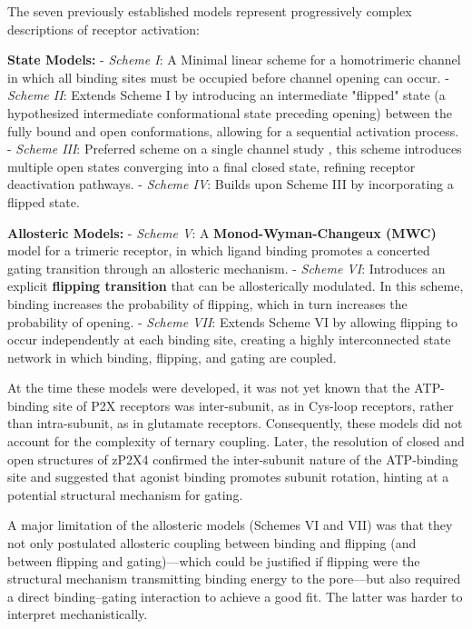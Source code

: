 \documentclass[9pt]{elife}
\begin{document}
	The seven previously established models represent progressively complex descriptions of receptor activation:
	
	\textbf{State Models:}  
	- \textit{Scheme I}: A Minimal linear scheme for a homotrimeric channel in which all binding sites must be occupied before channel opening can occur.  
	- \textit{Scheme II}: Extends Scheme I by introducing an intermediate "flipped" state (a hypothesized intermediate conformational state preceding opening) between the fully bound and open conformations, allowing for a sequential activation process.  
	- \textit{Scheme III}: Preferred scheme on a single channel study \cite{properties_single_channe}, this scheme introduces multiple open states converging into a final closed state, refining receptor deactivation pathways.  
	- \textit{Scheme IV}: Builds upon Scheme III by incorporating a flipped state.  
	
	\textbf{Allosteric Models:}  
	- \textit{Scheme V}: A \textbf{Monod-Wyman-Changeux (MWC)} model for a trimeric receptor, in which ligand binding promotes a concerted gating transition through an allosteric mechanism.  
	- \textit{Scheme VI}: Introduces an explicit \textbf{flipping transition} that can be allosterically modulated. In this scheme, binding increases the probability of flipping, which in turn increases the probability of opening.  
	- \textit{Scheme VII}: Extends Scheme VI by allowing flipping to occur independently at each binding site, creating a highly interconnected state network in which binding, flipping, and gating are coupled.  
	
	At the time these models were developed, it was not yet known that the ATP-binding site of P2X receptors was inter-subunit, as in Cys-loop receptors, rather than intra-subunit, as in glutamate receptors. Consequently, these models did not account for the complexity of ternary coupling. Later, the resolution of closed and open structures of zP2X4 \cite{cerrada_p2x, abierta_p2x} confirmed the inter-subunit nature of the ATP-binding site and suggested that agonist binding promotes subunit rotation, hinting at a potential structural mechanism for gating.
	
	A major limitation of the allosteric models (Schemes VI and VII) was that they not only postulated allosteric coupling between binding and flipping (and between flipping and gating)—which could be justified if flipping were the structural mechanism transmitting binding energy to the pore—but also required a direct binding–gating interaction to achieve a good fit. The latter was harder to interpret mechanistically. 
	
\end{document}
